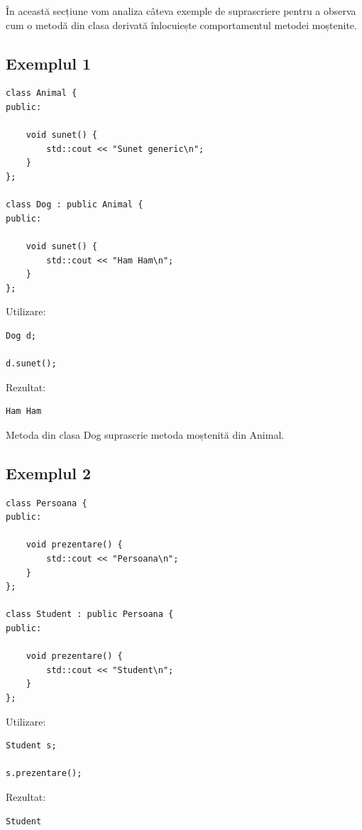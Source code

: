\documentclass[12pt,a4paper]{article}
\begin{document}
În această secțiune vom analiza câteva exemple de suprascriere pentru a observa cum o metodă din clasa derivată înlocuiește comportamentul metodei moștenite.

\subsection{Exemplul 1}

\begin{verbatim}
class Animal {
public:

    void sunet() {
        std::cout << "Sunet generic\n";
    }
};

class Dog : public Animal {
public:

    void sunet() {
        std::cout << "Ham Ham\n";
    }
};
\end{verbatim}

Utilizare:

\begin{verbatim}
Dog d;

d.sunet();
\end{verbatim}

Rezultat:

\begin{verbatim}
Ham Ham
\end{verbatim}

Metoda din clasa Dog suprascrie metoda moștenită din Animal.

\subsection{Exemplul 2}

\begin{verbatim}
class Persoana {
public:

    void prezentare() {
        std::cout << "Persoana\n";
    }
};

class Student : public Persoana {
public:

    void prezentare() {
        std::cout << "Student\n";
    }
};
\end{verbatim}

Utilizare:

\begin{verbatim}
Student s;

s.prezentare();
\end{verbatim}

Rezultat:

\begin{verbatim}
Student
\end{verbatim}
\end{document}

